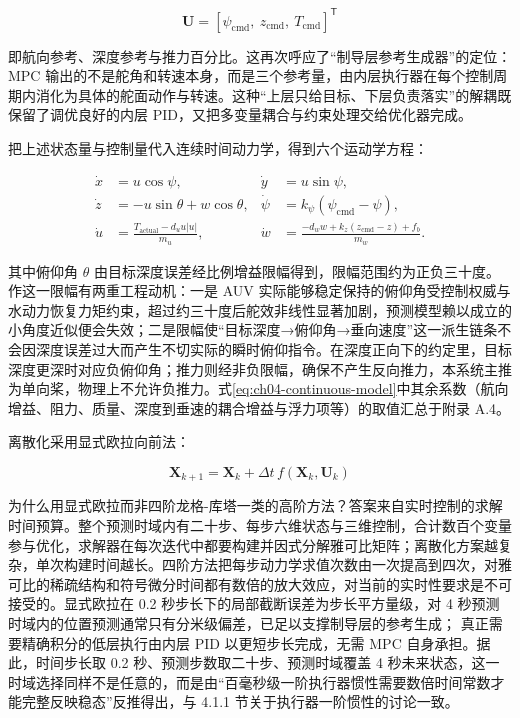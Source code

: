 \begin{equation}
\mathbf{U} = [\psi_{\mathrm{cmd}},\ z_{\mathrm{cmd}},\ T_{\mathrm{cmd}}]^{\mathsf{T}}
\label{eq:ch04-mpc-control}
\end{equation}

即航向参考、深度参考与推力百分比。这再次呼应了``制导层参考生成器''的定位：MPC 输出的不是舵角和转速本身，而是三个参考量，由内层执行器在每个控制周期内消化为具体的舵面动作与转速。这种``上层只给目标、下层负责落实''的解耦既保留了调优良好的内层 PID，又把多变量耦合与约束处理交给优化器完成。

把上述状态量与控制量代入连续时间动力学，得到六个运动学方程：

\begin{equation}
\begin{aligned}
\dot{x} &= u\cos\psi, &
\dot{y} &= u\sin\psi, \\
\dot{z} &= -u\sin\theta+w\cos\theta, &
\dot{\psi} &= k_{\psi}(\psi_{\mathrm{cmd}}-\psi), \\
\dot{u} &= \frac{T_{\mathrm{actual}}-d_u u|u|}{m_u}, &
\dot{w} &= \frac{-d_w w+k_z(z_{\mathrm{cmd}}-z)+f_b}{m_w}.
\end{aligned}
\label{eq:ch04-continuous-model}
\end{equation}

其中俯仰角 \(\theta\) 由目标深度误差经比例增益限幅得到，限幅范围约为正负三十度。作这一限幅有两重工程动机：一是 AUV 实际能够稳定保持的俯仰角受控制权威与水动力恢复力矩约束，超过约三十度后舵效非线性显著加剧，预测模型赖以成立的小角度近似便会失效；二是限幅使``目标深度→俯仰角→垂向速度''这一派生链条不会因深度误差过大而产生不切实际的瞬时俯仰指令。在深度正向下的约定里，目标深度更深时对应负俯仰角；推力则经非负限幅，确保不产生反向推力，本系统主推为单向桨，物理上不允许负推力。式\eqref{eq:ch04-continuous-model}中其余系数（航向增益、阻力、质量、深度到垂速的耦合增益与浮力项等）的取值汇总于附录 A.4。

离散化采用显式欧拉向前法：

\begin{equation}
\mathbf{X}_{k+1}
= \mathbf{X}_k+\Delta t\,f(\mathbf{X}_k,\mathbf{U}_k)
\label{eq:ch04-euler-discretization}
\end{equation}

为什么用显式欧拉而非四阶龙格-库塔一类的高阶方法？答案来自实时控制的求解时间预算。整个预测时域内有二十步、每步六维状态与三维控制，合计数百个变量参与优化，求解器在每次迭代中都要构建并因式分解雅可比矩阵；离散化方案越复杂，单次构建时间越长。四阶方法把每步动力学求值次数由一次提高到四次，对雅可比的稀疏结构和符号微分时间都有数倍的放大效应，对当前的实时性要求是不可接受的。显式欧拉在 0.2 秒步长下的局部截断误差为步长平方量级，对 4 秒预测时域内的位置预测通常只有分米级偏差，已足以支撑制导层的参考生成；
真正需要精确积分的低层执行由内层 PID 以更短步长完成，无需 MPC 自身承担。据此，时间步长取 0.2 秒、预测步数取二十步、预测时域覆盖 4 秒未来状态，这一时域选择同样不是任意的，而是由``百毫秒级一阶执行器惯性需要数倍时间常数才能完整反映稳态''反推得出，与 4.1.1 节关于执行器一阶惯性的讨论一致。

